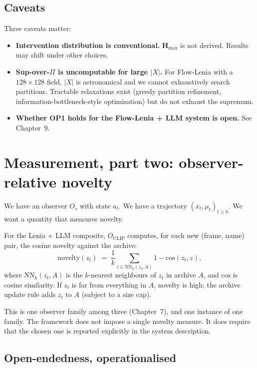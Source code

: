 \subsection*{Caveats}

Three caveats matter:

\begin{itemize}[leftmargin=1.5em,itemsep=2pt]
  \item \textbf{Intervention distribution is conventional.}
    $\mathbf{H}_{\max}$ is not derived. Results may shift under other
    choices.
  \item \textbf{Sup-over-$\Pi$ is uncomputable for large $|X|$.} For
    Flow-Lenia with a $128 \times 128$ field, $|X|$ is astronomical
    and we cannot exhaustively search partitions. Tractable
    relaxations exist (greedy partition refinement,
    information-bottleneck-style optimisation) but do not exhaust the
    supremum.
  \item \textbf{Whether OP1 holds for the Flow-Lenia + LLM system is
    open.} See Chapter~9.
\end{itemize}

\section{Measurement, part two: observer-relative novelty}

We have an observer $O_s$ with state $a_t$. We have a trajectory
$(x_t, \mu_t)_{t \geq 0}$. We want a quantity that measures novelty.

For the Lenia + LLM composite, $O_{\mathrm{CLIP}}$ computes, for each
new (frame, name) pair, the cosine novelty against the archive:
\[
  \mathrm{novelty}(z_t) \;=\; \frac{1}{k} \sum_{z \in \mathrm{NN}_k(z_t,
  A)} 1 - \mathrm{cos}(z_t, z),
\]
where $\mathrm{NN}_k(z_t, A)$ is the $k$-nearest neighbours of $z_t$ in
archive $A$, and $\mathrm{cos}$ is cosine similarity. If $z_t$ is far
from everything in $A$, novelty is high; the archive update rule
adds $z_t$ to $A$ (subject to a size cap).

This is one observer family among three (Chapter~7), and one
instance of one family. The framework does not impose a single
novelty measure. It does require that the chosen one is reported
explicitly in the system description.

\subsection*{Open-endedness, operationalised}

